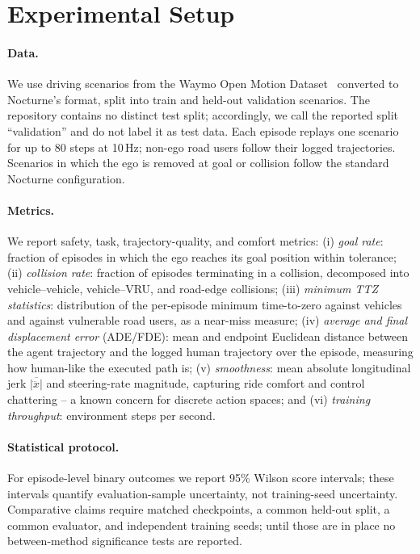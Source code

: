 \documentclass{article}
\begin{document}
\section{Experimental Setup}
\label{sec:setup}

\paragraph{Data.}
We use driving scenarios from the Waymo Open Motion
Dataset~\citep{ettinger2021waymo} converted to Nocturne's format, split into
train and held-out validation scenarios. The repository contains no distinct
test split; accordingly, we call the reported split ``validation'' and do
not label it as test data. Each episode replays one scenario for up to 80 steps at
10\,Hz; non-ego road users follow their logged trajectories. Scenarios in
which the ego is removed at goal or collision follow the standard Nocturne
configuration.

\paragraph{Metrics.}
We report safety, task, trajectory-quality, and comfort metrics:
(i) \emph{goal rate}: fraction of episodes in which the ego reaches its goal
position within tolerance; (ii) \emph{collision rate}: fraction of episodes
terminating in a collision, decomposed into vehicle--vehicle,
vehicle--VRU, and road-edge collisions; (iii) \emph{minimum TTZ statistics}:
distribution of the per-episode minimum time-to-zero against vehicles and
against vulnerable road users, as a near-miss measure; (iv) \emph{average
and final displacement error} (ADE/FDE): mean and endpoint Euclidean
distance between the agent trajectory and the logged human trajectory over
the episode, measuring how human-like the executed path is;
(v) \emph{smoothness}: mean absolute longitudinal jerk
$\overline{|\dddot{x}|}$ and steering-rate magnitude, capturing ride comfort
and control chattering -- a known concern for discrete action spaces; and
(vi) \emph{training throughput}: environment steps per second.

\paragraph{Statistical protocol.}
For episode-level binary outcomes we report 95\% Wilson score intervals;
these intervals quantify evaluation-sample uncertainty, not training-seed
uncertainty. Comparative claims require matched checkpoints, a common
held-out split, a common evaluator, and independent training seeds; until
those are in place no between-method significance tests are reported.
\end{document}

